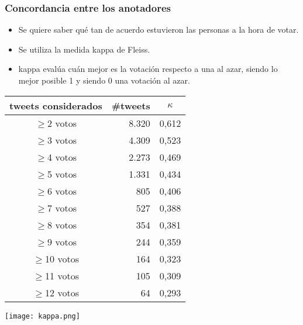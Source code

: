 \begin{frame}[allowframebreaks]
    \frametitle{Concordancia entre los anotadores}

    \begin{itemize}
        \item Se quiere saber qué tan de acuerdo estuvieron las personas a la hora de votar.
        \item Se utiliza la medida kappa de Fleiss.
        \item kappa evalúa cuán mejor es la votación respecto a una al azar, siendo lo mejor posible 1 y siendo 0 una votación al azar.
    \end{itemize}


    \framebreak

    \begin{center}
        \begin{tabular}{ c | r | c }
            tweets considerados & \#tweets & $\kappa$ \\
            \hline
            $\geq$2 votos & 8.320 & 0,612 \\
            $\geq$3 votos & 4.309 & 0,523 \\
            $\geq$4 votos & 2.273 & 0,469 \\
            $\geq$5 votos & 1.331 & 0,434 \\
            $\geq$6 votos & 805 & 0,406 \\
            $\geq$7 votos & 527 & 0,388 \\
            $\geq$8 votos & 354 & 0,381 \\
            $\geq$9 votos & 244 & 0,359 \\
            $\geq$10 votos & 164 & 0,323 \\
            $\geq$11 votos & 105 & 0,309 \\
            $\geq$12 votos & 64 & 0,293 \\
        \end{tabular}

        \texttt{[image: kappa.png]}
    \end{center}


\end{frame}
